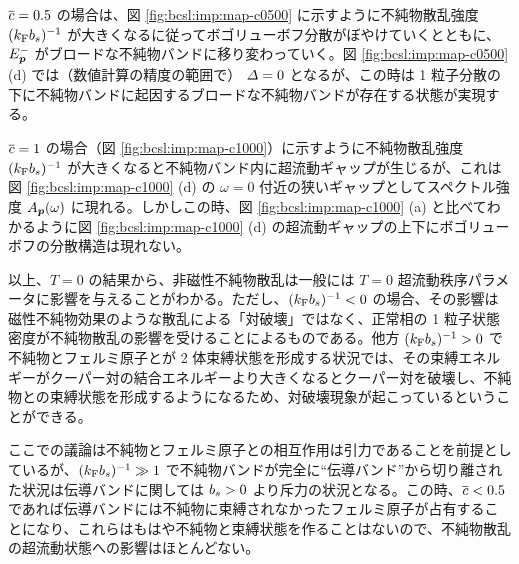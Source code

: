 $\overline{c}=0.5$ の場合は、図 \ref{fig:bcsl:imp:map-c0500} に示すように不純物散乱強度 $(k_{\text{F}} b_s)^{-1}$ が大きくなるに従ってボゴリューボフ分散がぼやけていくとともに、$E_{\bm{p}}^{-}$ がブロードな不純物バンドに移り変わっていく。図 \ref{fig:bcsl:imp:map-c0500} (d) では（数値計算の精度の範囲で） $\varDelta=0$ となるが、この時は 1 粒子分散の下に不純物バンドに起因するブロードな不純物バンドが存在する状態が実現する。


$\overline{c}=1$ の場合（図 \ref{fig:bcsl:imp:map-c1000}）に示すように不純物散乱強度 $(k_{\text{F}} b_s)^{-1}$ が大きくなると不純物バンド内に超流動ギャップが生じるが、これは図 \ref{fig:bcsl:imp:map-c1000} (d) の $\omega=0$ 付近の狭いギャップとしてスペクトル強度 $A_{\bm{p}}(\omega)$ に現れる。しかしこの時、図 \ref{fig:bcsl:imp:map-c1000} (a) と比べてわかるように図 \ref{fig:bcsl:imp:map-c1000} (d) の超流動ギャップの上下にボゴリューボフの分散構造は現れない。

以上、$T=0$ の結果から、非磁性不純物散乱は一般には $T=0$ 超流動秩序パラメータに影響を与えることがわかる。ただし、$(k_{\text{F}} b_s)^{-1}<0$ の場合、その影響は磁性不純物効果のような散乱による「対破壊」ではなく、正常相の 1 粒子状態密度が不純物散乱の影響を受けることによるものである。他方 $(k_{\text{F}} b_s)^{-1}>0$ で不純物とフェルミ原子とが 2 体束縛状態を形成する状況では、その束縛エネルギーがクーパー対の結合エネルギーより大きくなるとクーパー対を破壊し、不純物との束縛状態を形成するようになるため、対破壊現象が起こっているということができる。

ここでの議論は不純物とフェルミ原子との相互作用は引力であることを前提としているが、$(k_{\text{F}} b_s)^{-1}\gg 1$ で不純物バンドが完全に“伝導バンド”から切り離された状況は伝導バンドに関しては $b_s>0$ より斥力の状況となる。この時、$\overline{c}<0.5$ であれば伝導バンドには不純物に束縛されなかったフェルミ原子が占有することになり、これらはもはや不純物と束縛状態を作ることはないので、不純物散乱の超流動状態への影響はほとんどない。


